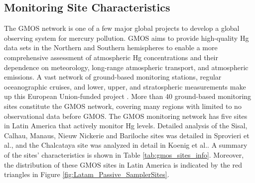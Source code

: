 \subsection{Monitoring Site Characteristics} \label{c2_monitoring_site_characteristics}
\begin{flushleft}
 The GMOS network is one of a few major global projects to develop a global observing system for mercury pollution. GMOS aims to provide high-quality Hg data sets in the Northern and Southern hemispheres to enable a more comprehensive assessment of atmospheric Hg concentrations and their dependence on meteorology, long-range atmospheric transport, and atmospheric emissions\cite{sprovieri_atmospheric_2016}. A vast network of ground-based monitoring stations, regular oceanographic cruises, and lower, upper, and stratospheric measurements make up this European Union-funded project \cite{koenig_seasonal_2021,sprovieri_atmospheric_2016}. More than 40 ground-based monitoring sites constitute the GMOS network, covering many regions with limited to no observational data before GMOS\cite{sprovieri_atmospheric_2016}. The GMOS monitoring network has five sites in Latin America that actively monitor Hg levels. Detailed analysis of the Sisal, Calhau, Manaus, Nieuw Nickerie and Bariloche sites was detailed in Sprovieri et al.\cite{sprovieri_atmospheric_2016}, and the Chalcataya site was analyzed in detail in Koenig et al.\cite{koenig_seasonal_2021}. A summary of the sites' characteristics is shown in Table \ref{tab:gmos_sites_info}. Moreover, the distribution of these GMOS sites in Latin America is indicated by the red triangles in Figure \ref{fig:Latam_Passive_SamplerSites}. 
  \end{flushleft}
  
